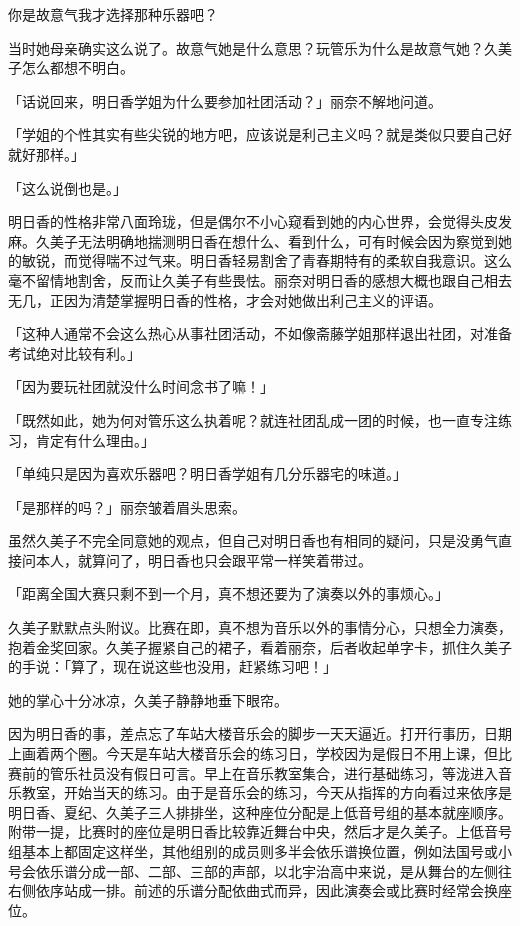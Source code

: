 \documentclass[UTF8]{ctexart}
\begin{document}
    你是故意气我才选择那种乐器吧？ 

    当时她母亲确实这么说了。故意气她是什么意思？玩管乐为什么是故意气她？久美子怎么都想不明白。 

    「话说回来，明日香学姐为什么要参加社团活动？」丽奈不解地问道。 

    「学姐的个性其实有些尖锐的地方吧，应该说是利己主义吗？就是类似只要自己好就好那样。」 

    「这么说倒也是。」 

    明日香的性格非常八面玲珑，但是偶尔不小心窥看到她的内心世界，会觉得头皮发麻。久美子无法明确地揣测明日香在想什么、看到什么，可有时候会因为察觉到她的敏锐，而觉得喘不过气来。明日香轻易割舍了青春期特有的柔软自我意识。这么毫不留情地割舍，反而让久美子有些畏怯。丽奈对明日香的感想大概也跟自己相去无几，正因为清楚掌握明日香的性格，才会对她做出利己主义的评语。 

    「这种人通常不会这么热心从事社团活动，不如像斋藤学姐那样退出社团，对准备考试绝对比较有利。」 

    「因为要玩社团就没什么时间念书了嘛！」 

    「既然如此，她为何对管乐这么执着呢？就连社团乱成一团的时候，也一直专注练习，肯定有什么理由。」 

    「单纯只是因为喜欢乐器吧？明日香学姐有几分乐器宅的味道。」 

    「是那样的吗？」丽奈皱着眉头思索。 

    虽然久美子不完全同意她的观点，但自己对明日香也有相同的疑问，只是没勇气直接问本人，就算问了，明日香也只会跟平常一样笑着带过。 

    「距离全国大赛只剩不到一个月，真不想还要为了演奏以外的事烦心。」 

    久美子默默点头附议。比赛在即，真不想为音乐以外的事情分心，只想全力演奏，抱着金奖回家。久美子握紧自己的裙子，看着丽奈，后者收起单字卡，抓住久美子的手说：「算了，现在说这些也没用，赶紧练习吧！」 

    她的掌心十分冰凉，久美子静静地垂下眼帘。 

    因为明日香的事，差点忘了车站大楼音乐会的脚步一天天逼近。打开行事历，日期上画着两个圈。今天是车站大楼音乐会的练习日，学校因为是假日不用上课，但比赛前的管乐社员没有假日可言。早上在音乐教室集合，进行基础练习，等泷进入音乐教室，开始当天的练习。由于是音乐会的练习，今天从指挥的方向看过来依序是明日香、夏纪、久美子三人排排坐，这种座位分配是上低音号组的基本就座顺序。附带一提，比赛时的座位是明日香比较靠近舞台中央，然后才是久美子。上低音号组基本上都固定这样坐，其他组别的成员则多半会依乐谱换位置，例如法国号或小号会依乐谱分成一部、二部、三部的声部，以北宇治高中来说，是从舞台的左侧往右侧依序站成一排。前述的乐谱分配依曲式而异，因此演奏会或比赛时经常会换座位。 
\end{document}

